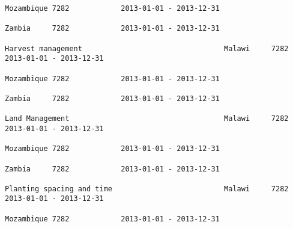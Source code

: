 \documentclass[11pt]{article}
\begin{document}
\begin{Verbatim}[commandchars=\\\{\}]
                                                                                                                                                                                                                 Mozambique 7282            2013-01-01 - 2013-12-31   
                                                                                                                                                                                                                 Zambia     7282            2013-01-01 - 2013-12-31   
                                                                                                                                                              Harvest management                                 Malawi     7282            2013-01-01 - 2013-12-31   
                                                                                                                                                                                                                 Mozambique 7282            2013-01-01 - 2013-12-31   
                                                                                                                                                                                                                 Zambia     7282            2013-01-01 - 2013-12-31   
                                                                                                                                                              Land Management                                    Malawi     7282            2013-01-01 - 2013-12-31   
                                                                                                                                                                                                                 Mozambique 7282            2013-01-01 - 2013-12-31   
                                                                                                                                                                                                                 Zambia     7282            2013-01-01 - 2013-12-31   
                                                                                                                                                              Planting spacing and time                          Malawi     7282            2013-01-01 - 2013-12-31   
                                                                                                                                                                                                                 Mozambique 7282            2013-01-01 - 2013-12-31   

\end{Verbatim}
\end{document}

